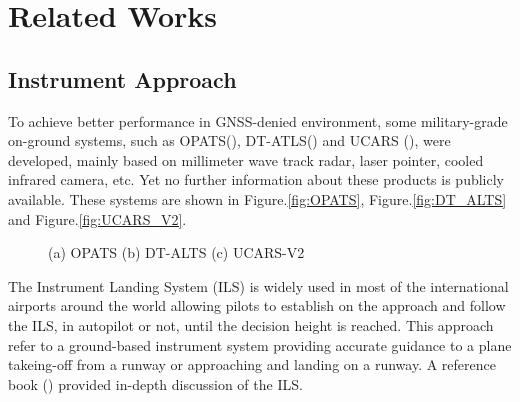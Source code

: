\section{Related Works}

\subsection{Instrument Approach}
To achieve better performance in GNSS-denied environment, some military-grade on-ground systems, such as OPATS(\cite{RUAG}), DT-ATLS(\cite{SierraNevadaCorporation}) and UCARS (\cite{SierraNevadaCorporationa}), were developed, mainly based on millimeter wave track radar, laser pointer, cooled infrared camera, etc. Yet no further information about these products is publicly available. These systems are shown in Figure.\ref{fig:OPATS}, Figure.\ref{fig:DT_ALTS} and Figure.\ref{fig:UCARS_V2}.

\begin{figure}[!tb]
	\centering
	\caption{(a) OPATS (b) DT-ALTS (c) UCARS-V2}
\end{figure}

The Instrument Landing System (ILS) is widely used in most of the international airports around the world allowing pilots to establish on the approach and follow the ILS, in autopilot or not, until the decision height is reached. This approach refer to a ground-based instrument system providing accurate guidance to a plane takeing-off from a runway or approaching and landing on a runway. A reference book (\cite{Nolan2010}) provided in-depth discussion of the ILS.

